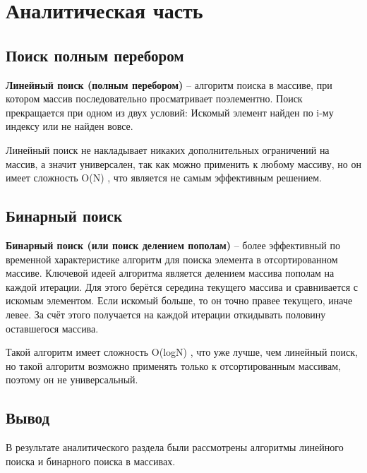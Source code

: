 \chapter{Аналитическая часть}
\section{Поиск полным перебором}
\textbf{Линейный поиск (полным перебором)} – алгоритм поиска в массиве, при котором массив последовательно просматривает поэлементно. Поиск прекращается при одном из двух условий: Искомый элемент найден по i-му индексу или не найден вовсе.

Линейный поиск не накладывает никаких дополнительных ограничений на массив, а значит универсален, так как можно применить к любому массиву, но он имеет сложность O(N) \cite{virt}, что является не самым эффективным решением.

\section{Бинарный поиск}
\textbf{Бинарный поиск (или поиск делением пополам)} – более эффективный по временной характеристике алгоритм для поиска элемента в отсортированном массиве. Ключевой идеей алгоритма является делением массива пополам на каждой итерации. Для этого берётся середина текущего массива и сравнивается с искомым элементом. Если искомый больше, то он точно правее текущего, иначе левее. За счёт этого получается на каждой итерации откидывать половину оставшегося массива.

Такой алгоритм имеет сложность O(logN) \cite{virt}, что уже лучше, чем линейный поиск, но такой алгоритм возможно применять только к отсортированным массивам, поэтому он не универсальный.


\section*{Вывод}
В результате аналитического раздела были рассмотрены алгоритмы линейного поиска и бинарного поиска в массивах.

\clearpage
